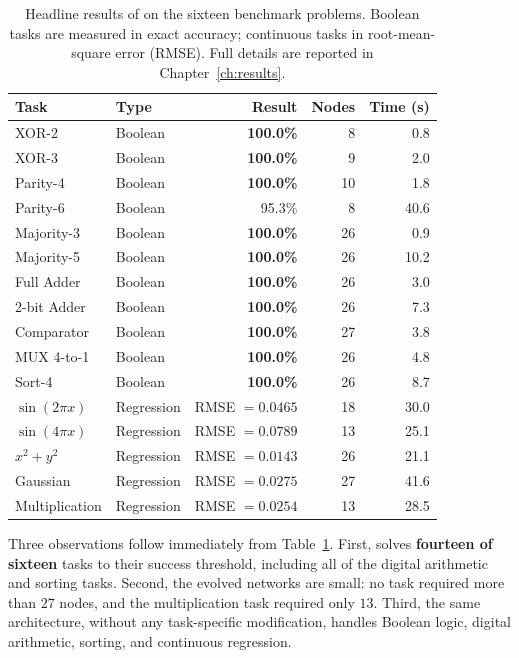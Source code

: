 \begin{table}[h]
  \centering
  \small
  \caption{Headline results of \modnet{} on the sixteen benchmark
    problems. Boolean tasks are measured in exact accuracy; continuous
    tasks in root-mean-square error (RMSE). Full details are reported
    in Chapter~\ref{ch:results}.}
  \label{tab:intro-headline}
  \begin{tabular}{llrrr}
    \toprule
    \textbf{Task} & \textbf{Type} & \textbf{Result} & \textbf{Nodes} & \textbf{Time (s)} \\
    \midrule
    XOR-2               & Boolean    & \textbf{100.0\%} &  8 &  0.8 \\
    XOR-3               & Boolean    & \textbf{100.0\%} &  9 &  2.0 \\
    Parity-4            & Boolean    & \textbf{100.0\%} & 10 &  1.8 \\
    Parity-6            & Boolean    & 95.3\%           &  8 & 40.6 \\
    Majority-3          & Boolean    & \textbf{100.0\%} & 26 &  0.9 \\
    Majority-5          & Boolean    & \textbf{100.0\%} & 26 & 10.2 \\
    Full Adder          & Boolean    & \textbf{100.0\%} & 26 &  3.0 \\
    2-bit Adder         & Boolean    & \textbf{100.0\%} & 26 &  7.3 \\
    Comparator          & Boolean    & \textbf{100.0\%} & 27 &  3.8 \\
    MUX 4-to-1          & Boolean    & \textbf{100.0\%} & 26 &  4.8 \\
    Sort-4              & Boolean    & \textbf{100.0\%} & 26 &  8.7 \\
    \midrule
    $\sin(2\pi x)$      & Regression & RMSE $= 0.0465$  & 18 & 30.0 \\
    $\sin(4\pi x)$      & Regression & RMSE $= 0.0789$  & 13 & 25.1 \\
    $x^2 + y^2$         & Regression & RMSE $= 0.0143$  & 26 & 21.1 \\
    Gaussian            & Regression & RMSE $= 0.0275$  & 27 & 41.6 \\
    Multiplication      & Regression & RMSE $= 0.0254$  & 13 & 28.5 \\
    \bottomrule
  \end{tabular}
\end{table}

Three observations follow immediately from
Table~\ref{tab:intro-headline}. First, \modnet{} solves \textbf{fourteen
of sixteen} tasks to their success threshold, including all of the digital
arithmetic and sorting tasks. Second, the evolved networks are small: no
task required more than $27$ nodes, and the multiplication task required
only $13$. Third, the same architecture, without any task-specific
modification, handles Boolean logic, digital arithmetic, sorting, and
continuous regression.

